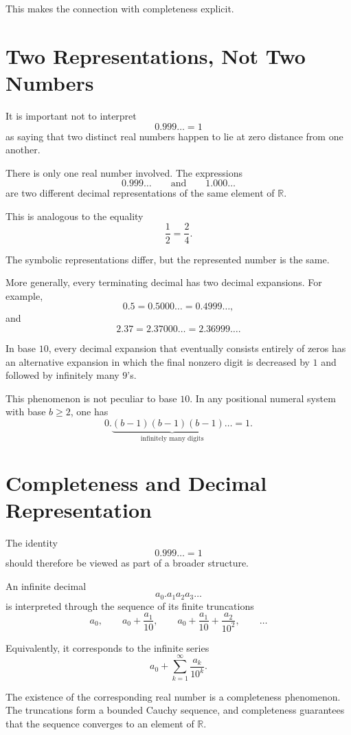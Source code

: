 \documentclass{essay}
\begin{document}
This makes the connection with completeness explicit.

\section{Two Representations, Not Two Numbers}

It is important not to interpret
\[ 0.999\ldots=1 \]
as saying that two distinct real numbers happen to lie at zero distance from one another.

There is only one real number involved. The expressions
\[ 0.999\ldots \qquad\text{and}\qquad 1.000\ldots \]
are two different decimal representations of the same element of \(\mathbb{R}\).

This is analogous to the equality
\[ \frac{1}{2}=\frac{2}{4}. \]

The symbolic representations differ, but the represented number is the same.

More generally, every terminating decimal has two decimal expansions. For example,
\[ 0.5=0.5000\ldots=0.4999\ldots, \]
and
\[ 2.37=2.37000\ldots=2.36999\ldots. \]

In base \(10\), every decimal expansion that eventually consists entirely of zeros has an alternative expansion in which the final nonzero digit is decreased by \(1\) and followed by infinitely many \(9\)'s.

This phenomenon is not peculiar to base \(10\). In any positional numeral system with base \(b\geq2\), one has
\[ 0.\underbrace{(b-1)(b-1)(b-1)\ldots}_{\text{infinitely many digits}} = 1. \]

\section{Completeness and Decimal Representation}

The identity
\[ 0.999\ldots=1 \]
should therefore be viewed as part of a broader structure.

An infinite decimal
\[ a_{0}.a_{1}a_{2}a_{3}\ldots \]
is interpreted through the sequence of its finite truncations
\[ a_{0},\qquad a_{0}+\frac{a_{1}}{10},\qquad a_{0}+\frac{a_{1}}{10}+\frac{a_{2}}{10^{2}},\qquad \ldots \]

Equivalently, it corresponds to the infinite series
\[ a_{0}+\sum_{k=1}^{\infty}\frac{a_{k}}{10^{k}}. \]

The existence of the corresponding real number is a completeness phenomenon. The truncations form a bounded Cauchy sequence, and completeness guarantees that the sequence converges to an element of \(\mathbb{R}\).
\end{document}
